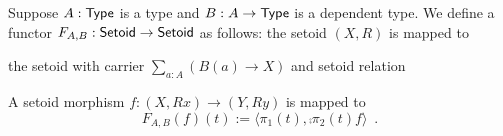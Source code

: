 

\begin{definition}\label{def:poly_functor}
 Suppose $A : \mathsf{Type}$ is a type and $B: A \to \mathsf{Type}$ is a dependent type.
 We define a functor $F_{A,B} : \mathsf{Setoid} \to \mathsf{Setoid}$ as follows:
 the setoid $(X,R)$ is mapped to

 the setoid with carrier $\sum_{a:A}(B(a) \to X)$ and setoid relation
 
 A setoid morphism $f : (X,Rx) \to (Y,Ry)$ is mapped to 
 \[F_{A,B}(f) (t):= \langle \pi_1(t), \comp{\pi_2(t)}{f} \rangle \enspace . \]
 
 
\end{definition}


